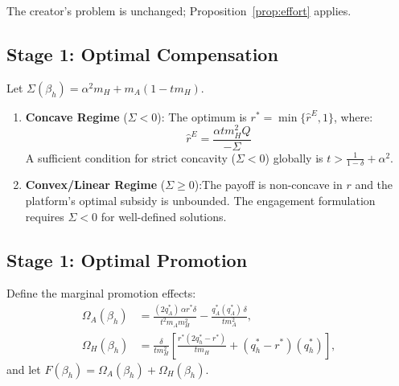 \documentclass[mnsc,nonblindrev]{informs3_NoOR}
\begin{document}
The creator's problem is unchanged; Proposition~\ref{prop:effort} applies.

\subsection{Stage 1: Optimal Compensation}

\begin{proposition}\label{prop:rstar-eng}
Let $\Sigma(\beta_h) = \alpha^2 m_H + m_A(1 - tm_H ) $. 
\begin{enumerate}
\item[\textup{(a)}] \textbf{Concave Regime} ($\Sigma < 0$): The optimum is $r^* = \min\{\hat{r}^E, 1\}$, where:
\begin{equation}\label{eq:rhat-eng}
\hat{r}^E = \frac{\alpha t m_H^2Q }{-\Sigma}
\end{equation}
A sufficient condition for strict concavity ($\Sigma < 0$) globally is $t > \frac{1}{1-\delta} + \alpha^2$. 
\item[\textup{(b)}] \textbf{Convex/Linear Regime} ($\Sigma \geq  0$):The payoff is non-concave in $r$ and the platform's optimal subsidy is unbounded. The engagement formulation requires $\Sigma < 0$ for well-defined solutions.
\end{enumerate}
\end{proposition}

\subsection{Stage 1: Optimal Promotion}
Define the marginal promotion effects:
\begin{align}
\Omega_A(\beta_h) &= \frac{(2q_A^*)\,\alpha r^*\delta}{t^2 m_A m_H^2} - \frac{q_A^*(q_A^*)\,\delta}{tm_A^2}, \label{eq:OmA}\\[4pt]
\Omega_H(\beta_h) &= \frac{\delta}{tm_H^2}\!\left[\frac{r^*(2q_h^*-r^*)}{tm_H}+(q_h^*-r^*)(q_h^*)\right], \label{eq:OmH}
\end{align}
and let $F(\beta_h) = \Omega_A(\beta_h)+\Omega_H(\beta_h)$.
 
\end{document}
